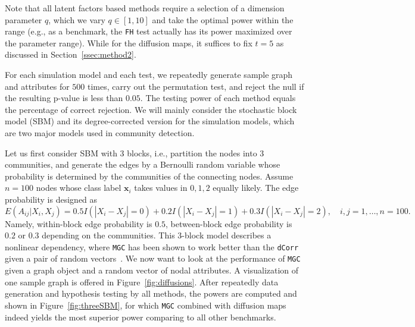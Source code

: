 \documentclass[11pt]{article}
\theoremstyle{definition}
\begin{document}
Note that all latent factors based methods require a selection of a dimension parameter $q$, which we vary $q \in [1,10]$ and take the optimal power within the range (e.g., as a benchmark, the \texttt{FH} test actually has its power maximized over the parameter range). While for the diffusion maps, it suffices to fix $t=5$ as discussed in Section~\ref{ssec:method2}.

For each simulation model and each test, we repeatedly generate sample graph and attributes for $500$ times, carry out the permutation test, and reject the null if the resulting p-value is less than $0.05$. The testing power of each method equals the percentage of correct rejection. We will mainly consider the stochastic block model (SBM) and its degree-corrected version for the simulation models, which are two major models used in community detection. 

Let us first consider SBM with $3$ blocks, i.e., partition the nodes into $3$ communities, and generate the edges by a Bernoulli random variable whose probability is determined by the communities of the connecting nodes. Assume $n=100$ nodes whose class label $\mathbf{x}_i$ takes values in $0,1,2$ equally likely. The edge probability is designed as
\begin{equation}
\label{eq:Three}
E(A_{ij} | X_{i}, X_{j}) = 0.5 I(|X_{i} - X_{j}| = 0) + 0.2 I(|X_{i} - X_{j}| = 1) + 0.3 I(|X_{i} - X_{j}| = 2), \quad i,j = 1, \ldots, n = 100.
\end{equation} 
Namely, within-block edge probability is $0.5$, between-block edge probability is $0.2$ or $0.3$ depending on the communities. This 3-block model describes a nonlinear dependency, where \texttt{MGC} has been shown to work better than the \texttt{dCorr} given a pair of random vectors~\cite{shen2016discovering}. We now want to look at the performance of \texttt{MGC} given a graph object and a random vector of nodal attributes. A visualization of one sample graph is offered in Figure~\ref{fig:diffusions}. After repeatedly data generation and hypothesis testing by all methods, the powers are computed and shown in Figure~\ref{fig:threeSBM}, for which \texttt{MGC} combined with diffusion maps indeed yields the most superior power comparing to all other benchmarks.
\end{document}
